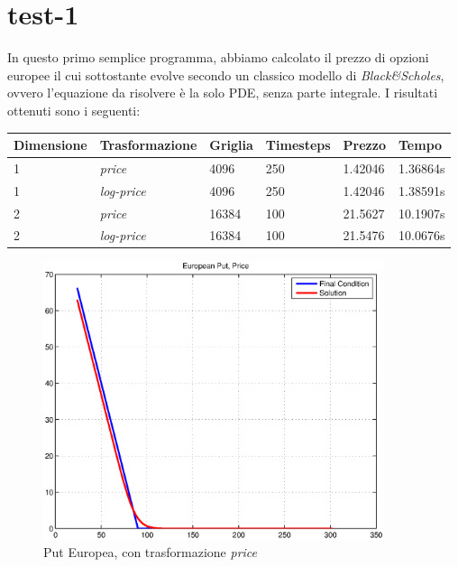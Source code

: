 \documentclass[a4paper,10pt]{report}
\theoremstyle{plain}
\theoremstyle{definition}
\theoremstyle{remark}
\begin{document}
\section{\textsf{test-1}}
In questo primo semplice programma, abbiamo calcolato il prezzo di opzioni europee il cui sottostante evolve secondo un classico modello di \emph{Black\&Scholes}, ovvero l'equazione da risolvere \`e la solo PDE, senza parte integrale. I risultati ottenuti sono i seguenti:
\begin{center}
\begin{tabular}{| l | l | l | l | l | l |}
\hline
Dimensione & Trasformazione & Griglia & Timesteps & Prezzo & Tempo \\ \hline
1 & \emph{price} & 4096 & 250 & 1.42046 & 1.36864s \\ \hline
1 & \emph{log-price} & 4096 & 250 & 1.42046 & 1.38591s \\ \hline
2 & \emph{price} & 16384 & 100 & 21.5627 & 10.1907s \\ \hline
2 & \emph{log-price} & 16384 & 100 & 21.5476 & 10.0676s \\ \hline
\end{tabular}
\end{center}
\begin{figure}[h!]
\begin{center}
\includegraphics[width=10cm]{img/test1-put1dprice.eps}
\caption{Put Europea, con trasformazione \emph{price}}
\label{fig:test1-put1d-price}
\end{center}
\end{figure}
\end{document}
